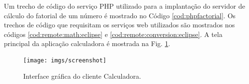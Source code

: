 Um trecho de código do serviço PHP utilizado para a implantação do servidor de
cálculo do fatorial de um número é mostrado no Código \ref{cod:phpfactorial}. Os
trechos de código que requisitam os serviços web utilizados são mostrados nos
códigos \ref{cod:remote:math:eclipse} e \ref{cod:remote:conversion:eclipse}. A
tela principal da aplicação calculadora é mostrada na Fig.
\ref{fig:arquitetura:gui}. 

\begin{figure}[htb]
  \centering
  \texttt{[image: imgs/screenshot]}
  \caption{Interface gráfica do cliente Calculadora.}
  \label{fig:arquitetura:gui}
\end{figure}
